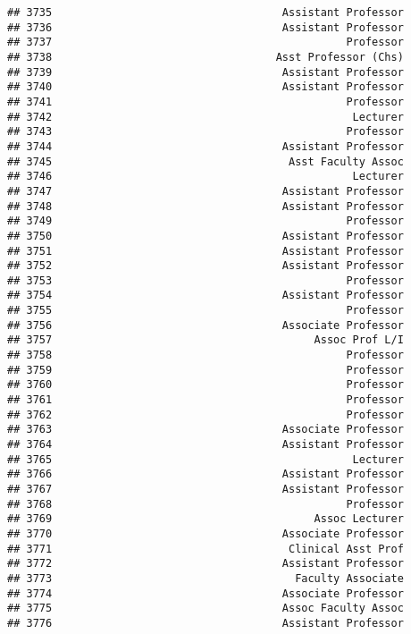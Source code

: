 \documentclass[
]{article}
\begin{document}
\begin{verbatim}
## 3735                                    Assistant Professor
## 3736                                    Assistant Professor
## 3737                                              Professor
## 3738                                   Asst Professor (Chs)
## 3739                                    Assistant Professor
## 3740                                    Assistant Professor
## 3741                                              Professor
## 3742                                               Lecturer
## 3743                                              Professor
## 3744                                    Assistant Professor
## 3745                                     Asst Faculty Assoc
## 3746                                               Lecturer
## 3747                                    Assistant Professor
## 3748                                    Assistant Professor
## 3749                                              Professor
## 3750                                    Assistant Professor
## 3751                                    Assistant Professor
## 3752                                    Assistant Professor
## 3753                                              Professor
## 3754                                    Assistant Professor
## 3755                                              Professor
## 3756                                    Associate Professor
## 3757                                         Assoc Prof L/I
## 3758                                              Professor
## 3759                                              Professor
## 3760                                              Professor
## 3761                                              Professor
## 3762                                              Professor
## 3763                                    Associate Professor
## 3764                                    Assistant Professor
## 3765                                               Lecturer
## 3766                                    Assistant Professor
## 3767                                    Assistant Professor
## 3768                                              Professor
## 3769                                         Assoc Lecturer
## 3770                                    Associate Professor
## 3771                                     Clinical Asst Prof
## 3772                                    Assistant Professor
## 3773                                      Faculty Associate
## 3774                                    Associate Professor
## 3775                                    Assoc Faculty Assoc
## 3776                                    Assistant Professor

\end{verbatim}
\end{document}
